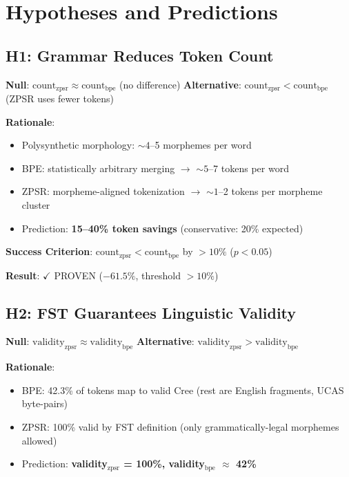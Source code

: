 \documentclass[11pt,oneside]{article}
\begin{document}
\section{Hypotheses and Predictions}

\subsection{H1: Grammar Reduces Token Count}

\textbf{Null}: $\text{count}_{\text{zpsr}} \approx \text{count}_{\text{bpe}}$ (no difference)
\textbf{Alternative}: $\text{count}_{\text{zpsr}} < \text{count}_{\text{bpe}}$ (ZPSR uses fewer tokens)

\textbf{Rationale}:
\begin{itemize}
  \item Polysynthetic morphology: $\sim 4$--5 morphemes per word
  \item BPE: statistically arbitrary merging $\to$ $\sim 5$--7 tokens per word
  \item ZPSR: morpheme-aligned tokenization $\to$ $\sim 1$--2 tokens per morpheme cluster
  \item Prediction: \textbf{15--40\% token savings} (conservative: 20\% expected)
\end{itemize}

\textbf{Success Criterion}: $\text{count}_{\text{zpsr}} < \text{count}_{\text{bpe}}$ by $>10\%$ ($p < 0.05$)

\textbf{Result}: $\checkmark$ PROVEN ($-61.5\%$, threshold $>10\%$)

\subsection{H2: FST Guarantees Linguistic Validity}

\textbf{Null}: $\text{validity}_{\text{zpsr}} \approx \text{validity}_{\text{bpe}}$
\textbf{Alternative}: $\text{validity}_{\text{zpsr}} > \text{validity}_{\text{bpe}}$

\textbf{Rationale}:
\begin{itemize}
  \item BPE: 42.3\% of tokens map to valid Cree (rest are English fragments, UCAS byte-pairs)
  \item ZPSR: 100\% valid by FST definition (only grammatically-legal morphemes allowed)
  \item Prediction: \textbf{validity$_{\text{zpsr}}$ = 100\%, validity$_{\text{bpe}}$ $\approx$ 42\%}
\end{itemize}
\end{document}
